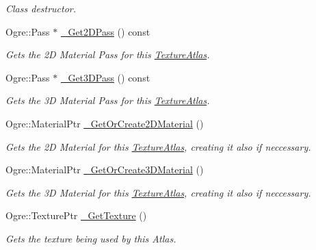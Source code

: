 \begin{DoxyCompactItemize}
\begin{DoxyCompactList}\small\item\em Class destructor. \item\end{DoxyCompactList}\item 
Ogre::Pass $\ast$ \hyperlink{classMezzanine_1_1UI_1_1TextureAtlas_a9a7ae5f9b7ab6668802074e73da91f9c}{\_\-Get2DPass} () const 
\begin{DoxyCompactList}\small\item\em Gets the 2D Material Pass for this \hyperlink{classMezzanine_1_1UI_1_1TextureAtlas}{TextureAtlas}. \item\end{DoxyCompactList}\item 
Ogre::Pass $\ast$ \hyperlink{classMezzanine_1_1UI_1_1TextureAtlas_a831b7a62e3806aac71a204824604642d}{\_\-Get3DPass} () const 
\begin{DoxyCompactList}\small\item\em Gets the 3D Material Pass for this \hyperlink{classMezzanine_1_1UI_1_1TextureAtlas}{TextureAtlas}. \item\end{DoxyCompactList}\item 
Ogre::MaterialPtr \hyperlink{classMezzanine_1_1UI_1_1TextureAtlas_a09fa9d93e7db0470f7192f997907a757}{\_\-GetOrCreate2DMaterial} ()
\begin{DoxyCompactList}\small\item\em Gets the 2D Material for this \hyperlink{classMezzanine_1_1UI_1_1TextureAtlas}{TextureAtlas}, creating it also if neccessary. \item\end{DoxyCompactList}\item 
Ogre::MaterialPtr \hyperlink{classMezzanine_1_1UI_1_1TextureAtlas_aceafe2e3ddb4ea77dc9b401c5548fe2c}{\_\-GetOrCreate3DMaterial} ()
\begin{DoxyCompactList}\small\item\em Gets the 3D Material for this \hyperlink{classMezzanine_1_1UI_1_1TextureAtlas}{TextureAtlas}, creating it also if neccessary. \item\end{DoxyCompactList}\item 
Ogre::TexturePtr \hyperlink{classMezzanine_1_1UI_1_1TextureAtlas_a22d0cccf6e3603db136510a075fc6d50}{\_\-GetTexture} ()
\begin{DoxyCompactList}\small\item\em Gets the texture being used by this Atlas. \item\end{DoxyCompactList}\item 

\end{DoxyCompactItemize}
